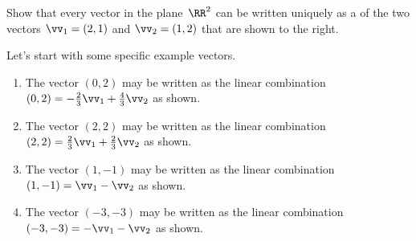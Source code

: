 \begin{example} \label{eg:2dnoc}
Show that every vector in the plane~\(\RR^2\) can be written uniquely as a  of the two vectors \(\vv_1=(2,1)\) and \(\vv_2=(1,2)\) that are shown to the right.
\vspace*{3\baselineskip} %

\begin{solution} 
Let's start with some specific example vectors.
\def\tmpp#1#2{\parbox[t]{20em}{\raggedright #2} \temp{#1}}
\begin{enumerate}
\item \tmpp1{The vector \((0,2)\) may be written as the linear combination \((0,2)=-\frac23\vv_1+\frac43\vv_2\) as shown.} 

\item \tmpp2{The vector \((2,2)\) may be written as the linear combination \((2,2)=\frac23\vv_1+\frac23\vv_2\) as shown.}

\item \tmpp3{The vector \((1,-1)\) may be written as the linear combination \((1,-1)=\vv_1-\vv_2\) as shown.}

\item \tmpp4{The vector \((-3,-3)\) may be written as the linear combination \((-3,-3)=-\vv_1-\vv_2\) as shown.}

\end{enumerate}


\end{solution}
\end{example}
